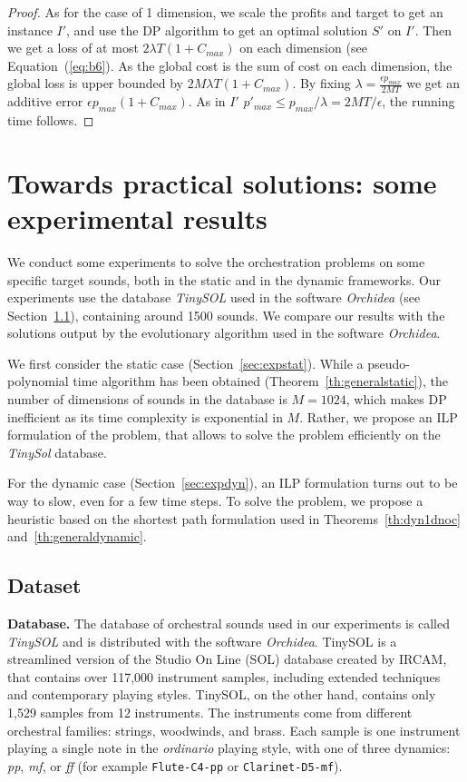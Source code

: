 \documentclass[a4paper]{book}
\newtheorem{proof}{\noindent{\bf Proof.} }
\begin{document}
\begin{proof}
As for the case of 1 dimension, we scale the profits and target to get an instance $I'$, and use the DP algorithm to get an optimal solution $S'$ on $I'$. Then we get a loss of at most $2\lambda T(1+C_{max})$ on each dimension (see Equation~(\ref{eq:b6}). As the global cost is the sum of cost on each dimension, the global loss is upper bounded by $2M\lambda T(1+C_{max})$. By fixing $\lambda=\frac{\epsilon p_{max}}{2MT}$ we get an additive error $\epsilon p_{max}(1+C_{max})$. As in $I'$ $p'_{max}\leq p_{max}/\lambda=2MT/\epsilon$, the running time follows.
\end{proof}

\section{Towards practical solutions: some experimental results}\label{sec:expe}

We conduct some experiments to solve the orchestration problems on some specific target sounds, both in the static and in the dynamic frameworks. Our experiments use the database \emph{TinySOL} used in the software \textit{Orchidea} (see Section~\ref{sec:dataset}), containing around 1500 sounds.  We compare our results with the solutions output by the evolutionary algorithm used in the software \textit{Orchidea}.

We first consider the static case (Section~\ref{sec:expstat}). While a pseudo-polynomial time algorithm has been obtained (Theorem~\ref{th:generalstatic}), the number of dimensions of sounds in the database is $M=1024$, which makes DP inefficient as its time complexity is exponential in $M$. Rather, we propose an ILP formulation of the problem, that allows to solve the problem efficiently on the {\it TinySol} database.

For the dynamic case (Section~\ref{sec:expdyn}), an ILP formulation turns out to be way to slow, even for a few time steps. To solve the problem, we propose a heuristic based on the shortest path formulation used in Theorems~\ref{th:dyn1dnoc} and~\ref{th:generaldynamic}.


\subsection{Dataset}
\label{sec:dataset}

{\bf Database.} The database of orchestral sounds used in our experiments is called \emph{TinySOL} and is distributed with the software \textit{Orchidea}. TinySOL is a streamlined version of the Studio On Line (SOL) database created by IRCAM, that contains over 117,000 instrument samples, including extended techniques and contemporary playing styles. TinySOL, on the other hand, contains only 1,529 samples from 12 instruments. The instruments come from different orchestral families: strings, woodwinds, and brass. Each sample is one instrument playing a single note in the \emph{ordinario} playing style, with one of three dynamics: \textit{pp}, \textit{mf}, or \textit{ff} (for example \texttt{Flute-C4-pp} or \texttt{Clarinet-D5-mf}). 
\end{document}
